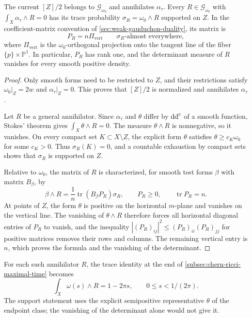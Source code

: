 \begin{proposition}\label{prop:radial-flow-annihilator-support}
The current $[Z]/2$ belongs to $\mathscr G_{\omega_0}$ and annihilates $\alpha_\tau$. Every $R\in\mathscr G_{\omega_0}$ with $\int_X\alpha_\tau\wedge R=0$ has its trace probability $\sigma_R=\omega_0\wedge R$ supported on $Z$. In the coefficient-matrix convention of \cref{sec:weak-gauduchon-duality}, its matrix is
\[
 P_R=n\Pi_{\mathrm{vert}}\qquad\sigma_R\text{-almost everywhere},
\]
where $\Pi_{\mathrm{vert}}$ is the $\omega_0$-orthogonal projection onto the tangent line of the fiber $\{p\}\times\mathbb P^1$. In particular, $P_R$ has rank one, and the determinant measure of $R$ vanishes for every smooth positive density.
\end{proposition}
\begin{proof}
Only smooth forms need to be restricted to $Z$, and their restrictions satisfy $\omega_0|_Z=2w$ and $\alpha_\tau|_Z=0$. This proves that $[Z]/2$ is normalized and annihilates $\alpha_\tau$.

Let $R$ be a general annihilator. Since $\alpha_\tau$ and $\theta$ differ by $\mathrm{dd}^{\mathrm{c}}$ of a smooth function, Stokes' theorem gives $\int_X\theta\wedge R=0$. The measure $\theta\wedge R$ is nonnegative, so it vanishes. On every compact set $K\subset X\setminus Z$, the explicit form $\theta$ satisfies $\theta\geq c_K\omega_0$ for some $c_K>0$. Thus $\sigma_R(K)=0$, and a countable exhaustion by compact sets shows that $\sigma_R$ is supported on $Z$.

Relative to $\omega_0$, the matrix of $R$ is characterized, for smooth test forms $\beta$ with matrix $B_\beta$, by
\[
 \beta\wedge R=\frac1n\operatorname{tr}(B_\beta P_R)\sigma_R,
 \qquad P_R\geq0,\qquad\operatorname{tr}P_R=n.
\]
At points of $Z$, the form $\theta$ is positive on the horizontal $m$-plane and vanishes on the vertical line. The vanishing of $\theta\wedge R$ therefore forces all horizontal diagonal entries of $P_R$ to vanish, and the inequality $|(P_R)_{ij}|^2\leq(P_R)_{ii}(P_R)_{jj}$ for positive matrices removes their rows and columns. The remaining vertical entry is $n$, which proves the formula and the vanishing of the determinant.
\end{proof}

For each such annihilator $R$, the trace identity at the end of \cref{subsec:chern-ricci-maximal-time} becomes
\[
 \int_X\omega(s)\wedge R=1-2\pi s,
 \qquad 0\leq s<1/(2\pi).
\]
The support statement uses the explicit semipositive representative $\theta$ of the endpoint class; the vanishing of the determinant alone would not give it.

